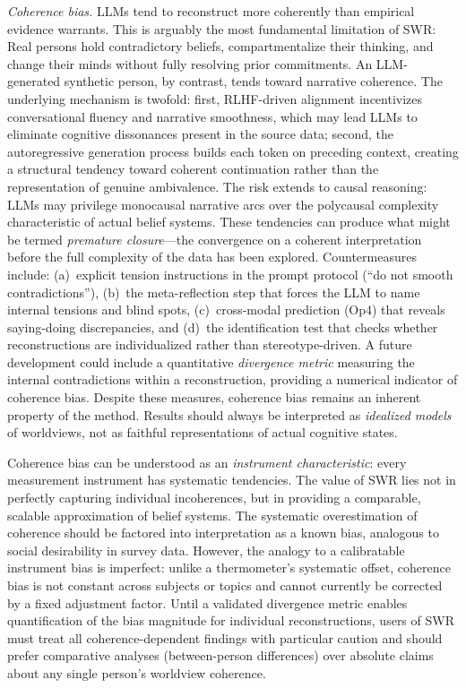 \documentclass[11pt,a4paper]{article}
\theoremstyle{definition}
\theoremstyle{plain}
\theoremstyle{remark}
\begin{document}
\emph{Coherence bias.} LLMs tend to reconstruct more coherently than empirical evidence warrants. This is arguably the most fundamental limitation of SWR: Real persons hold contradictory beliefs, compartmentalize their thinking, and change their minds without fully resolving prior commitments. An LLM-generated synthetic person, by contrast, tends toward narrative coherence. The underlying mechanism is twofold: first, RLHF-driven alignment incentivizes conversational fluency and narrative smoothness, which may lead LLMs to eliminate cognitive dissonances present in the source data; second, the autoregressive generation process builds each token on preceding context, creating a structural tendency toward coherent continuation rather than the representation of genuine ambivalence. The risk extends to causal reasoning: LLMs may privilege monocausal narrative arcs over the polycausal complexity characteristic of actual belief systems. These tendencies can produce what might be termed \emph{premature closure}---the convergence on a coherent interpretation before the full complexity of the data has been explored. Countermeasures include: (a)~explicit tension instructions in the prompt protocol (``do not smooth contradictions''), (b)~the meta-reflection step that forces the LLM to name internal tensions and blind spots, (c)~cross-modal prediction (Op4) that reveals saying-doing discrepancies, and (d)~the identification test that checks whether reconstructions are individualized rather than stereotype-driven. A future development could include a quantitative \emph{divergence metric} measuring the internal contradictions within a reconstruction, providing a numerical indicator of coherence bias. Despite these measures, coherence bias remains an inherent property of the method. Results should always be interpreted as \emph{idealized models} of worldviews, not as faithful representations of actual cognitive states.

Coherence bias can be understood as an \emph{instrument characteristic}: every measurement instrument has systematic tendencies. The value of SWR lies not in perfectly capturing individual incoherences, but in providing a comparable, scalable approximation of belief systems. The systematic overestimation of coherence should be factored into interpretation as a known bias, analogous to social desirability in survey data. However, the analogy to a calibratable instrument bias is imperfect: unlike a thermometer's systematic offset, coherence bias is not constant across subjects or topics and cannot currently be corrected by a fixed adjustment factor. Until a validated divergence metric enables quantification of the bias magnitude for individual reconstructions, users of SWR must treat all coherence-dependent findings with particular caution and should prefer comparative analyses (between-person differences) over absolute claims about any single person's worldview coherence.
\end{document}
